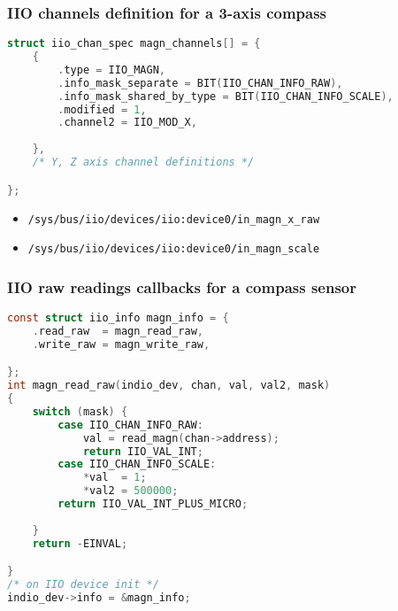 \documentclass[aspectratio=169]{beamer}
\begin{document}

\begin{frame}[fragile]
\frametitle{IIO channels definition for a 3-axis compass}
\begin{lstlisting}[language=C]
struct iio_chan_spec magn_channels[] = {
    {
        .type = IIO_MAGN,
        .info_mask_separate = BIT(IIO_CHAN_INFO_RAW),
        .info_mask_shared_by_type = BIT(IIO_CHAN_INFO_SCALE),
        .modified = 1,
        .channel2 = IIO_MOD_X,
    
    },
    /* Y, Z axis channel definitions */

};
\end{lstlisting}
\begin{itemize}
    \item \texttt{/sys/bus/iio/devices/iio:device0/in\_magn\_x\_raw}
    \item \texttt{/sys/bus/iio/devices/iio:device0/in\_magn\_scale}
\end{itemize}
\end{frame}


\begin{frame}[fragile]
\frametitle{IIO raw readings callbacks for a compass sensor}
\begin{lstlisting}[language=C]
const struct iio_info magn_info = {
    .read_raw  = magn_read_raw,
    .write_raw = magn_write_raw,

};
int magn_read_raw(indio_dev, chan, val, val2, mask)
{
    switch (mask) {
        case IIO_CHAN_INFO_RAW:
            val = read_magn(chan->address);
            return IIO_VAL_INT;
        case IIO_CHAN_INFO_SCALE:
            *val  = 1;
            *val2 = 500000;
        return IIO_VAL_INT_PLUS_MICRO;
    
    }
    return -EINVAL;

}
/* on IIO device init */
indio_dev->info = &magn_info;

\end{lstlisting}
\end{frame}

\end{document}

